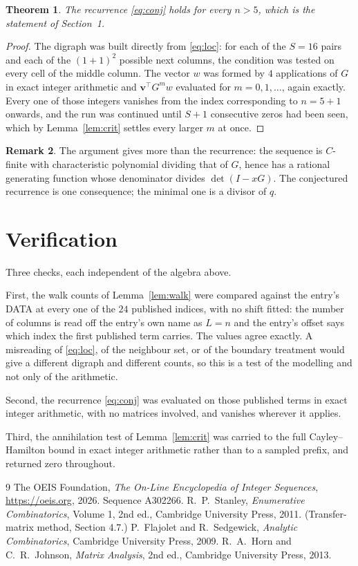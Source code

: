 \documentclass[11pt,a4paper]{article}
\theoremstyle{plain}
\newtheorem{theorem}{Theorem}
\theoremstyle{definition}
\newtheorem{remark}[theorem]{Remark}
\begin{document}
\begin{theorem}
The recurrence \eqref{eq:conj} holds for every $n>5$, which is the statement of
Section~1.
\end{theorem}

\begin{proof}
The digraph was built directly from \eqref{eq:loc}: for each of the $S=16$ pairs and each
of the $(1+1)^{2}$ possible next columns, the condition was tested on every cell of
the middle column. The vector $w$ was formed by $4$ applications of $G$ in exact integer
arithmetic and $\mathbf{v}^{\!\top}G^{m}w$ evaluated for $m=0,1,\dots$, again exactly.
Every one of those integers vanishes from the index corresponding to $n=5+1$ onwards,
and the run was continued until $S+1$ consecutive zeros had been seen, which by
Lemma~\ref{lem:crit} settles every larger $m$ at once.
\end{proof}

\begin{remark}
The argument gives more than the recurrence: the sequence is $C$-finite with characteristic
polynomial dividing that of $G$, hence has a rational generating function whose denominator
divides $\det(I-xG)$. The conjectured recurrence is one consequence; the minimal one is a
divisor of $q$.
\end{remark}

\section{Verification}

Three checks, each independent of the algebra above.

First, the walk counts of Lemma~\ref{lem:walk} were compared against the entry's DATA at
every one of the $24$ published indices, with no shift fitted: the number of columns is
read off the entry's own name as $L=n$ and the entry's offset says which index the first
published term carries. The values agree exactly. A misreading of \eqref{eq:loc}, of the
neighbour set, or of the boundary treatment would give a different digraph and different
counts, so this is a test of the modelling and not only of the arithmetic.

Second, the recurrence \eqref{eq:conj} was evaluated on those published terms in exact
integer arithmetic, with no matrices involved, and vanishes wherever it applies.

Third, the annihilation test of Lemma~\ref{lem:crit} was carried to the full
Cayley--Hamilton bound in exact integer arithmetic rather than to a sampled prefix, and
returned zero throughout.

\begin{thebibliography}{9}
 The OEIS Foundation, \emph{The On-Line Encyclopedia of Integer
Sequences}, \url{https://oeis.org}, 2026. Sequence A302266.
 R.~P.~Stanley, \emph{Enumerative Combinatorics}, Volume 1, 2nd ed.,
Cambridge University Press, 2011. (Transfer-matrix method, Section 4.7.)
 P.~Flajolet and R.~Sedgewick, \emph{Analytic Combinatorics}, Cambridge
University Press, 2009.
 R.~A.~Horn and C.~R.~Johnson, \emph{Matrix Analysis}, 2nd ed., Cambridge
University Press, 2013.
\end{thebibliography}
\end{document}
